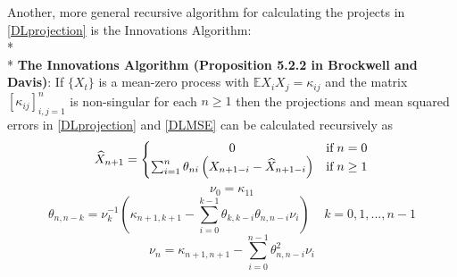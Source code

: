\documentclass[11pt]{article}
\begin{document}
Another, more general recursive algorithm for calculating the projects in \eqref{DLprojection} is the Innovations Algorithm:
\\*
\\*
{\bf The Innovations Algorithm (Proposition 5.2.2 in Brockwell and Davis)}: If $\{ X_t \}$ is a mean-zero process with $\mathbb{E}X_i X_j = \kappa_{ij}$ and the matrix $\left[ \kappa_{ij} \right]_{i,j=1}^n$ is non-singular for each $n \geq 1$ then the projections and mean squared errors in \eqref{DLprojection} and \eqref{DLMSE} can be calculated recursively as
\begin{equation}
\widehat{X}_{n+1} = 
\left\{\begin{matrix}
0 & \textup{if} \; n = 0\\ 
\sum_{i=1}^n \theta_{ni} \left( X_{n+1-i} - \widehat{X}_{n+1-i} \right) & \textup{if} \; n \geq 1 
\end{matrix}\right.
\end{equation}
\begin{equation}
\nu_0 = \kappa_{11}
\end{equation}
\begin{equation}
\theta_{n,n-k} = \nu_k^{-1} \left( \kappa_{n+1,k+1} - \sum_{i=0}^{k-1} \theta_{k,k-i} \theta_{n,n-i} \nu_i \right) \;\;\;\; k = 0,1,...,n-1
\end{equation}
\begin{equation}
\nu_n = \kappa_{n+1,n+1} - \sum_{i=0}^{n-1} \theta_{n,n-i}^2 \nu_i
\end{equation}
\end{document}
